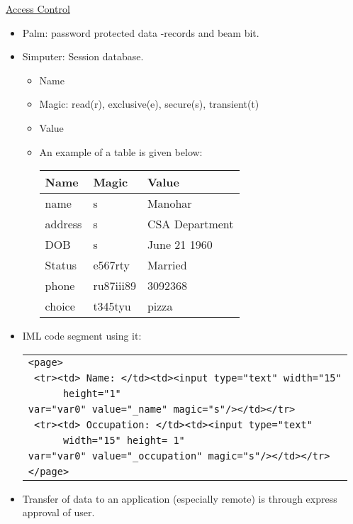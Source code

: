 \documentclass{slides}
\begin{document}
\begin{slide}
\begin{center}
\underline{Access Control}
\end{center}
\small
\begin{itemize}
\item Palm: password protected data -records and beam bit.
\item Simputer: Session database.
\begin {itemize}
\item Name
\item Magic: read(r), exclusive(e), secure(s), transient(t)
\item Value
\item An example of a table is given below:
\begin{center}
\begin{tabular}[!h]{|lll|}
     \hline
      Name  &   Magic   &     Value \\
     \hline
     name   &   s       & Manohar \\
     address &  s       & CSA Department\\
     DOB     &  s       & June 21 1960 \\
     Status  &  e567rty & Married \\
     phone   & ru87iii89 & 3092368 \\
     choice  & t345tyu  &  pizza \\
     \hline
\end{tabular}
\end{center}
\end{itemize}
\pagebreak
\item IML code segment using it:
\begin{center}
\begin{tabular}{|l|}
\hline
    \verb+<page>+\\
    \verb+ <tr><td> Name: </td><td><input type="text" width="15"+\\
    \verb+		height="1"+\\
    \verb+var="var0" value="_name" magic="s"/></td></tr>+\\
    \verb+ <tr><td> Occupation: </td><td><input type="text" +\\
    \verb+		width="15" height= 1"+\\
    \verb+var="var0" value="_occupation" magic="s"/></td></tr>+\\
    \verb+</page>+\\
\hline
\end{tabular}
\end{center}
\item  Transfer of data to an application (especially remote) is through express approval of user.
\end{itemize}
\end{slide}
\end{document}
